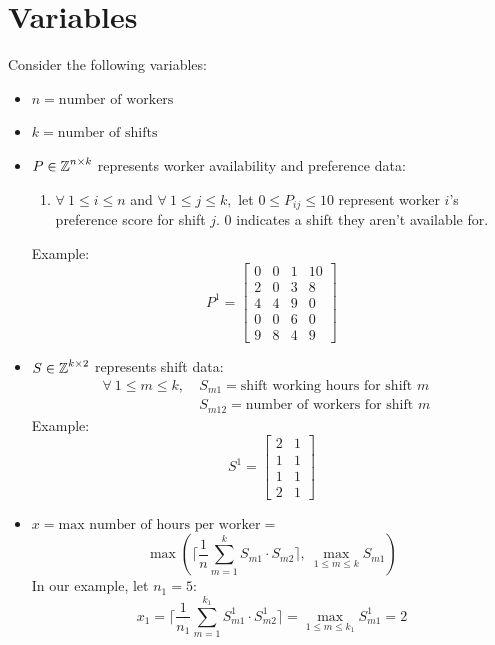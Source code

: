 \documentclass{article}
\begin{document}
\section*{Variables}
Consider the following variables:
\begin{itemize}
    \item $n=\text{number of workers}$
    \item $k=\text{number of shifts}$
    \item $P\in\operatorname{\mathbb{Z}}^{n\times k}$ represents worker availability and preference data:
    \begin{enumerate}[label=]
        \item $\forall\ 1\le i\le n$ and $\forall\ 1\le j\le k,$ let $0\le P_{ij}\le 10$ represent worker $i$'s preference score for shift $j$. 0 indicates a shift they aren't available for.
    \end{enumerate}
    Example:
        \[P^1=\begin{bmatrix}
            0&0&1&10\\
            2&0&3&8\\
            4&4&9&0\\
            0&0&6&0\\
            9&8&4&9
        \end{bmatrix}\]
    \item $S\in\operatorname{\mathbb{Z}}^{k\times2}$ represents shift data:
    \begin{align*}
        \forall\ 1\le m\le k,\ &S_{m1}=\text{shift working hours for shift $m$}&\\
        &S_{m12}=\text{number of workers for shift $m$}&
    \end{align*}
    Example:
        \[S^1=\begin{bmatrix}
            2&1\\
            1&1\\
            1&1\\
            2&1
        \end{bmatrix}\]
    \item $x=\text{max number of hours per worker}=$
        \[\max\left(\bigg\lceil\dfrac{1}{n}\sum_{m=1}^{k}S_{m1}\cdot S_{m2}\bigg\rceil,\ \max_{1\le m\le k}S_{m1}\right)\]
    In our example, let $n_1=5$:
        \[x_1=\bigg\lceil\dfrac{1}{n_1}\sum_{m=1}^{k_1}S^1_{m1}\cdot S^1_{m2}\bigg\rceil=\max_{1\le m\le k_1}S^1_{m1}=2\]

\end{itemize}
\end{document}
